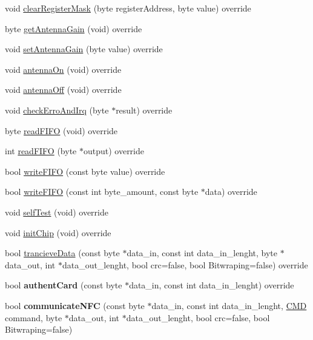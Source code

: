 \begin{DoxyCompactItemize}
\item 
void \hyperlink{class_r_c522_ac8dda7d6495cd0e79815ba771012b1b4}{clear\+Register\+Mask} (byte register\+Address, byte value) override
\item 
byte \hyperlink{class_r_c522_a08a908f30b995446c40b0ba89cf7a40c}{get\+Antenna\+Gain} (void) override
\item 
void \hyperlink{class_r_c522_aa5a6532f6ef2de5ca9236567ff88d346}{set\+Antenna\+Gain} (byte value) override
\item 
void \hyperlink{class_r_c522_ae4dbd838876dbd901d811af06e72a448}{antenna\+On} (void) override
\item 
void \hyperlink{class_r_c522_a21cce592f19fdbdc440bfec6045eb5ac}{antenna\+Off} (void) override
\item 
void \hyperlink{class_r_c522_a8797a7dcb6e4a7e3e30bf476ef47e894}{check\+Erro\+And\+Irq} (byte $\ast$result) override
\item 
byte \hyperlink{class_r_c522_a78c18a8805798cda24ed7c35af43f6c3}{read\+F\+I\+FO} (void) override
\item 
int \hyperlink{class_r_c522_a2e5ac8769707047e4064200d1829927c}{read\+F\+I\+FO} (byte $\ast$output) override
\item 
bool \hyperlink{class_r_c522_a3923806b946c8e35465faca39095fe05}{write\+F\+I\+FO} (const byte value) override
\item 
bool \hyperlink{class_r_c522_ac72080585e07afd1d51fbb4dbc6a8e58}{write\+F\+I\+FO} (const int byte\+\_\+amount, const byte $\ast$data) override
\item 
void \hyperlink{class_r_c522_ad21aeb49627a3da99d214798886267b9}{self\+Test} (void) override
\item 
void \hyperlink{class_r_c522_a87733717cd499f3d51ad9034f78cda9d}{init\+Chip} (void) override
\item 
bool \hyperlink{class_r_c522_a8204221660aea7c393eb49340d29876a}{trancieve\+Data} (const byte $\ast$data\+\_\+in, const int data\+\_\+in\+\_\+lenght, byte $\ast$data\+\_\+out, int $\ast$data\+\_\+out\+\_\+lenght, bool crc=false, bool Bitwraping=false) override
\item 
bool {\bfseries authent\+Card} (const byte $\ast$data\+\_\+in, const int data\+\_\+in\+\_\+lenght) override\hypertarget{class_r_c522_ab1cc4858ae90d050daba5ba6e2d49240}{}\label{class_r_c522_ab1cc4858ae90d050daba5ba6e2d49240}

\item 
bool {\bfseries communicate\+N\+FC} (const byte $\ast$data\+\_\+in, const int data\+\_\+in\+\_\+lenght, \hyperlink{class_r_c522_a8d2b2b09cb1978142f8c31b89049d968}{C\+MD} command, byte $\ast$data\+\_\+out, int $\ast$data\+\_\+out\+\_\+lenght, bool crc=false, bool Bitwraping=false)\hypertarget{class_r_c522_ab691cb4a0238846da16356e391cf2a60}{}\label{class_r_c522_ab691cb4a0238846da16356e391cf2a60}


\end{DoxyCompactItemize}
